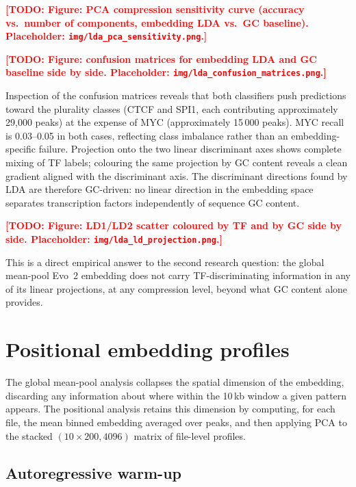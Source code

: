 \documentclass[12pt,a4paper,twoside,final]{book}
\newcommand{\todo}[1]{\textcolor{red}{\textbf{[TODO: #1]}}}
\begin{document}
\todo{Figure: PCA compression sensitivity curve (accuracy vs.\ number of components, embedding LDA vs.\ GC baseline). Placeholder: \texttt{img/lda\_pca\_sensitivity.png}.}

\todo{Figure: confusion matrices for embedding LDA and GC baseline side by side. Placeholder: \texttt{img/lda\_confusion\_matrices.png}.}

Inspection of the confusion matrices reveals that both classifiers push predictions toward the plurality classes (CTCF and SPI1, each contributing approximately 29,000 peaks) at the expense of MYC (approximately 15\,000 peaks). %
MYC recall is 0.03--0.05 in both cases, reflecting class imbalance rather than an embedding-specific failure.
Projection onto the two linear discriminant axes shows complete mixing of TF labels;
colouring the same projection by GC content reveals a clean gradient aligned with the discriminant axis.
The discriminant directions found by LDA are therefore GC-driven: no linear direction in the embedding space separates transcription factors independently of sequence GC content.

\todo{Figure: LD1/LD2 scatter coloured by TF and by GC side by side. Placeholder: \texttt{img/lda\_ld\_projection.png}.}

This is a direct empirical answer to the second research question: the global mean-pool Evo~2 embedding does not carry TF-discriminating information in any of its linear projections, at any compression level, beyond what GC content alone provides. %

\section{Positional embedding profiles}
\label{sec:results-block2}

The global mean-pool analysis collapses the spatial dimension of the embedding, discarding any information about where within the 10\,kb window a given pattern appears.
The positional analysis retains this dimension by computing, for each file, the mean binned embedding averaged over peaks, and then applying PCA to the stacked $(10 \times 200, 4096)$ matrix of file-level profiles.

\subsection{Autoregressive warm-up}
\end{document}
